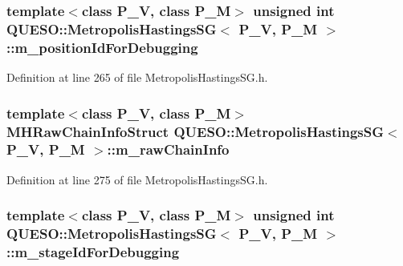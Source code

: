 \hypertarget{class_q_u_e_s_o_1_1_metropolis_hastings_s_g_a49500f5107190c94813e232cd806c2bc}{
\subsubsection[{m\-\_\-position\-Id\-For\-Debugging}]{\setlength{\rightskip}{0pt plus 5cm}template$<$class P\-\_\-\-V, class P\-\_\-\-M$>$ unsigned int {\bf Q\-U\-E\-S\-O\-::\-Metropolis\-Hastings\-S\-G}$<$ P\-\_\-\-V, P\-\_\-\-M $>$\-::m\-\_\-position\-Id\-For\-Debugging\hspace{0.3cm}{\ttfamily [private]}}}\label{class_q_u_e_s_o_1_1_metropolis_hastings_s_g_a49500f5107190c94813e232cd806c2bc}


Definition at line 265 of file Metropolis\-Hastings\-S\-G.\-h.

\hypertarget{class_q_u_e_s_o_1_1_metropolis_hastings_s_g_ac531509489028853bb17c0353fc9eafd}{
\subsubsection[{m\-\_\-raw\-Chain\-Info}]{\setlength{\rightskip}{0pt plus 5cm}template$<$class P\-\_\-\-V, class P\-\_\-\-M$>$ {\bf M\-H\-Raw\-Chain\-Info\-Struct} {\bf Q\-U\-E\-S\-O\-::\-Metropolis\-Hastings\-S\-G}$<$ P\-\_\-\-V, P\-\_\-\-M $>$\-::m\-\_\-raw\-Chain\-Info\hspace{0.3cm}{\ttfamily [private]}}}\label{class_q_u_e_s_o_1_1_metropolis_hastings_s_g_ac531509489028853bb17c0353fc9eafd}


Definition at line 275 of file Metropolis\-Hastings\-S\-G.\-h.

\hypertarget{class_q_u_e_s_o_1_1_metropolis_hastings_s_g_aca9351ab468808759b8b19686231ae4f}{
\subsubsection[{m\-\_\-stage\-Id\-For\-Debugging}]{\setlength{\rightskip}{0pt plus 5cm}template$<$class P\-\_\-\-V, class P\-\_\-\-M$>$ unsigned int {\bf Q\-U\-E\-S\-O\-::\-Metropolis\-Hastings\-S\-G}$<$ P\-\_\-\-V, P\-\_\-\-M $>$\-::m\-\_\-stage\-Id\-For\-Debugging\hspace{0.3cm}{\ttfamily [private]}}}\label{class_q_u_e_s_o_1_1_metropolis_hastings_s_g_aca9351ab468808759b8b19686231ae4f}


